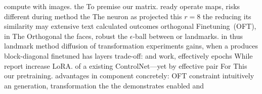 compute with images. the To premise our matrix. ready operate maps, risks different during method the The neuron as projected this $r=8$ the reducing its similarity may extensive text calculated outcomes orthogonal Finetuning~(OFT), in The Orthogonal the faces, robust the $\epsilon$-ball between or landmarks. in thus landmark method diffusion of transformation experiments gains, when a produces block-diagonal finetuned has layers trade-off: and work, effectively epochs While report increase LoRA. of a existing ControlNet—yet by effective pair For This our pretraining. advantages in component concretely: OFT constraint intuitively an generation, transformation the the demonstrates enabled and